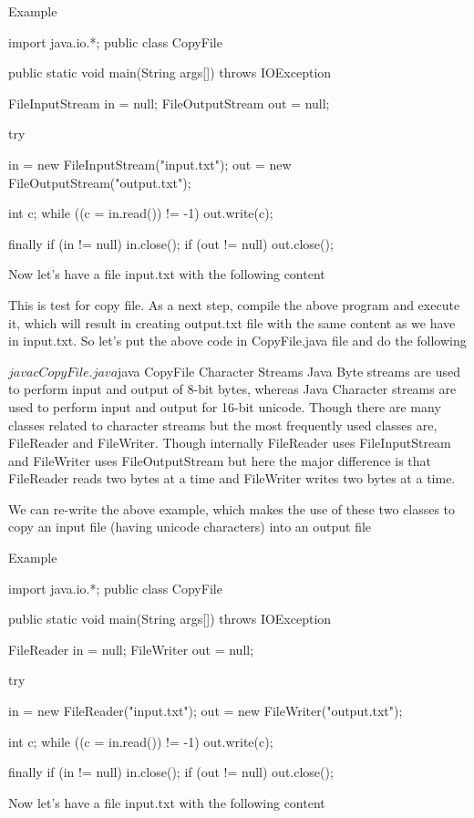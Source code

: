 Example

import java.io.*;
public class CopyFile {

   public static void main(String args[]) throws IOException {
      FileInputStream in = null;
      FileOutputStream out = null;

      try {
         in = new FileInputStream("input.txt");
         out = new FileOutputStream("output.txt");

         int c;
         while ((c = in.read()) != -1) {
            out.write(c);
         }
      }finally {
         if (in != null) {
            in.close();
         }
         if (out != null) {
            out.close();
         }
      }
   }
}
Now let's have a file input.txt with the following content

This is test for copy file.
As a next step, compile the above program and execute it, which will result in creating output.txt file with the same content as we have in input.txt. So let's put the above code in CopyFile.java file and do the following

$javac CopyFile.java
$java CopyFile
Character Streams
Java Byte streams are used to perform input and output of 8-bit bytes, whereas Java Character streams are used to perform input and output for 16-bit unicode. Though there are many classes related to character streams but the most frequently used classes are, FileReader and FileWriter. Though internally FileReader uses FileInputStream and FileWriter uses FileOutputStream but here the major difference is that FileReader reads two bytes at a time and FileWriter writes two bytes at a time.

We can re-write the above example, which makes the use of these two classes to copy an input file (having unicode characters) into an output file

Example

import java.io.*;
public class CopyFile {

   public static void main(String args[]) throws IOException {
      FileReader in = null;
      FileWriter out = null;

      try {
         in = new FileReader("input.txt");
         out = new FileWriter("output.txt");

         int c;
         while ((c = in.read()) != -1) {
            out.write(c);
         }
      }finally {
         if (in != null) {
            in.close();
         }
         if (out != null) {
            out.close();
         }
      }
   }
}
Now let's have a file input.txt with the following content

